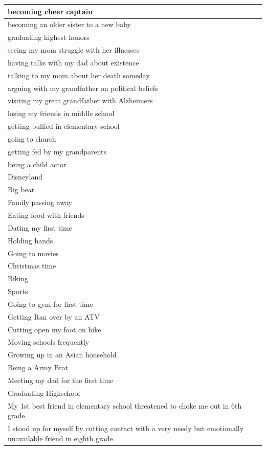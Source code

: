 \documentclass[
  .7em,
  letterpaper,
  DIV=11,
  numbers=noendperiod]{scrartcl}
\begin{document}
\begin{table}
\begin{tabular}{l}
\hline
becoming cheer captain\\
\hline
becoming an older sister to a new baby\\
\hline
graduating highest honors\\
\hline
seeing my mom struggle with her illnesses\\
\hline
having talks with my dad about existence\\
\hline
talking to my mom about her death someday\\
\hline
arguing with my grandfather on political beliefs\\
\hline
visiting my great grandfather with Alzheimers\\
\hline
losing my friends in middle school\\
\hline
getting bullied in elementary school\\
\hline
going to church\\
\hline
getting fed by my grandparents\\
\hline
being a child actor\\
\hline
Disneyland\\
\hline
Big bear\\
\hline
Family passing away\\
\hline
Eating food with friends\\
\hline
Dating my first time\\
\hline
Holding hands\\
\hline
Going to movies\\
\hline
Christmas time\\
\hline
Biking\\
\hline
Sports\\
\hline
Going to gym for first time\\
\hline
Getting Ran over by an ATV\\
\hline
Cutting open my foot on bike\\
\hline
Moving schools frequently\\
\hline
Growing up in an Asian household\\
\hline
Being a Army Brat\\
\hline
Meeting my dad for the first time\\
\hline
Graduating Highschool\\
\hline
My 1st best friend in elementary school threatened to choke me out in 6th grade.\\
\hline
I stood up for myself by cutting contact with a very needy but emotionally unavailable friend in eighth grade.\\

\end{tabular}
\end{table}
\end{document}
